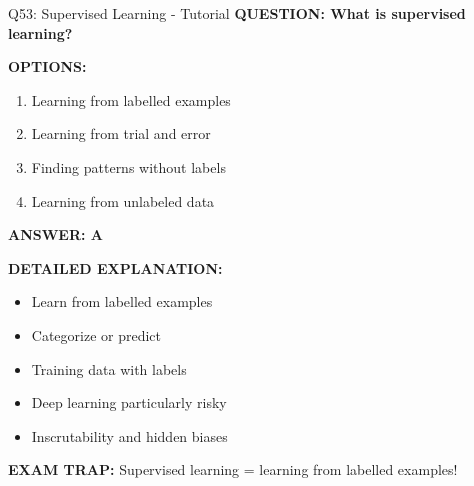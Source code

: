 \documentclass[8pt]{beamer}
\begin{document}
	\begin{frame}{Q53: Supervised Learning - Tutorial}
		\fontsize{6.5}{7.5}\selectfont
		\textbf{QUESTION: What is supervised learning?}
		
		\vspace{0.1cm}
		\textbf{OPTIONS:}
		\begin{enumerate}
			\item Learning from labelled examples
			\item Learning from trial and error
			\item Finding patterns without labels
			\item Learning from unlabeled data
		\end{enumerate}
		
		\vspace{0.1cm}
		\textcolor{myblue}{\textbf{ANSWER: A}}
		
		\vspace{0.1cm}
		\textbf{DETAILED EXPLANATION:}
		\begin{itemize}
			\item Learn from labelled examples
			\item Categorize or predict
			\item Training data with labels
			\item Deep learning particularly risky
			\item Inscrutability and hidden biases
		\end{itemize}
		
		\vspace{0.1cm}
		\textcolor{myred}{\textbf{EXAM TRAP:}} Supervised learning = \textcolor{myblue}{learning from labelled examples}!
	\end{frame}
	
\end{document}
